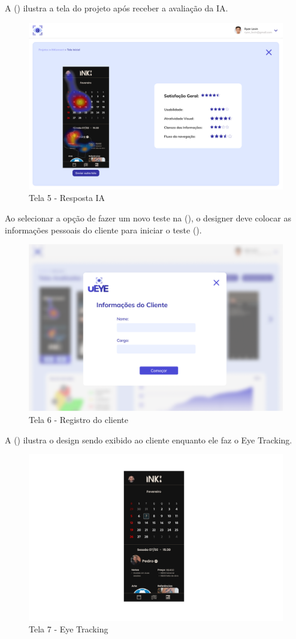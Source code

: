 A () ilustra a tela do projeto após receber a avaliação da IA.

\begin{figure}[H]
    \centering
    \caption{Tela 5 - Resposta IA}%
    \label{fig:pg-tela5}
    \includegraphics[width=0.72\linewidth]{Illustrations/tela5.png}
\end{figure}

Ao selecionar a opção de fazer um novo teste na (), o designer deve colocar as informações pessoais do cliente para iniciar o teste ().

\begin{figure}[H]
    \centering
    \caption{Tela 6 - Registro do cliente}%
    \label{fig:pg-tela6}
    \includegraphics[width=0.72\linewidth]{Illustrations/tela6.png}
\end{figure}

A () ilustra o design sendo exibido ao cliente enquanto ele faz o Eye Tracking.

\begin{figure}[H]
    \centering
    \caption{Tela 7 - Eye Tracking}%
    \label{fig:pg-tela7}
    \includegraphics[width=0.72\linewidth]{Illustrations/tela7.png}
\end{figure}

